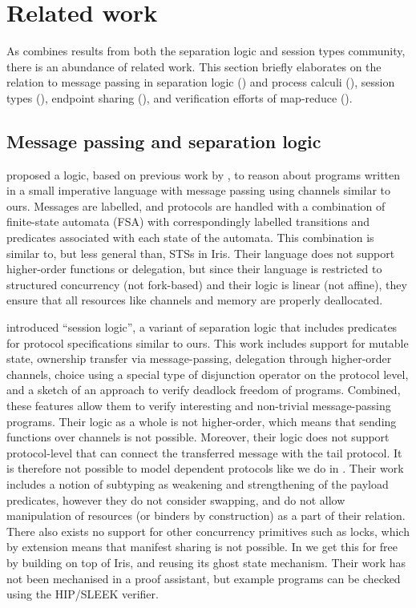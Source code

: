 \section{Related work}
\label{sec:related_work}

As \lname combines results from both the separation logic and session types
community, there is an abundance of related
work.
This section briefly elaborates on the relation to
message passing in separation logic () and
process calculi (),
session types (),
endpoint sharing (),
and verification efforts of map-reduce ().

\subsection{Message passing and separation logic}
\label{sec:related_sep}

\citet{villard-ICE2012} proposed a
logic, based on previous work by \citet{villard-APLAS2009}, to
reason about programs written in a small imperative language with
message passing using channels similar to ours.
Messages are labelled, and protocols are handled with a combination of
finite-state automata (FSA) with correspondingly labelled transitions and
predicates associated with each state of the automata.
This combination is similar to, but less general than, STSs in Iris.
Their language does not support higher-order functions or delegation, but
since their language is restricted to structured concurrency (\ie not fork-based)
and their logic is linear (\ie not affine), they ensure that all resources like
channels and memory are properly deallocated.

\citet{cracium-ICECCS2015} introduced ``session logic'', a variant of
separation logic that includes
predicates for protocol specifications similar to ours. This work
includes support for mutable state, ownership transfer via
message-passing,
delegation through higher-order
channels, choice using a special type of disjunction operator on
the protocol level, and a sketch of an approach to verify deadlock
freedom of programs. Combined, these features allow them to verify
interesting and non-trivial
message-passing programs.
Their logic as a whole is not
higher-order, which means that sending functions over channels is not
possible.
Moreover, their logic does not support protocol-level \binders that can connect the
transferred message with the tail protocol.
It is therefore not possible to model dependent protocols like we do in \lname.
Their work includes a notion of subtyping as weakening and strengthening of the
payload predicates, however they do not consider swapping, and do not allow
manipulation of resources (or binders by construction) as a part of their relation.
There also exists
no support for other concurrency primitives such as locks, which by
extension means that manifest sharing is not possible.
In \lname we get this for free by building on top of Iris, and reusing its ghost state mechanism.
Their work has not been
mechanised in a proof assistant, but example programs can
be checked using the HIP/SLEEK verifier.

